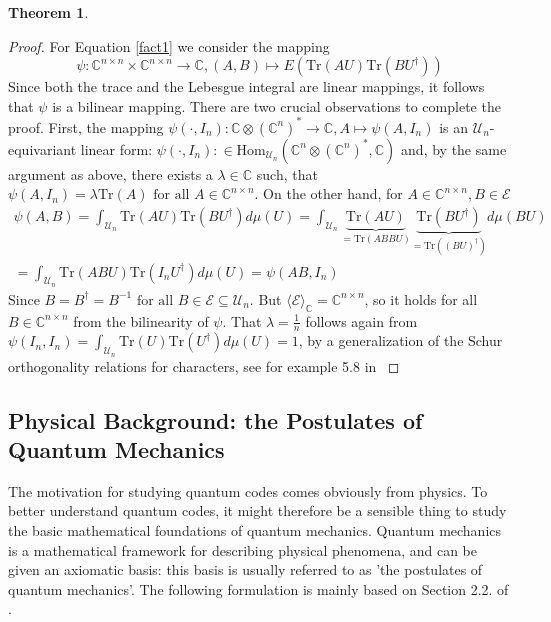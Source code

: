\documentclass[12pt,a4paper,BCOR15mm,twoside,DIV12]{article}
\def\E{\mathcal{E}}
\def\C{\mathbb{C}}
\def\U{\mathcal{U}}
\def\Hom{\text{Hom}}
\def\fa{\text{ for all }}
\def\Tr{\text{Tr}}
\theoremstyle{definition}
\newtheorem{theorem}[Satz]{Theorem}
\begin{document}
\begin{theorem}
\begin{proof}
For Equation \ref{fact1} we consider the mapping \[ \psi: \C^{n \times n} \times  \C^{n \times n} \rightarrow \C, (A,B) \mapsto  E(\Tr(AU)\Tr(B U^\dagger)) \]
Since both the trace and the Lebesgue integral are linear mappings, it follows that $\psi$ is a bilinear mapping. There are two crucial observations to complete the proof. First, the mapping $\psi( \cdot, I_n): \C \otimes (\C^n)^* \rightarrow \C, A \mapsto \psi(A,I_n)$ is an $\U_n$-equivariant linear form: $\psi( \cdot, I_n):  \in \Hom_{\U_n}(\C^n \otimes (\C^n)^*, \C)$ and, by the same argument as above, there exists a $\lambda \in \C$ such, that $\psi(A,I_n) = \lambda \Tr(A) \fa A \in \C^{n \times n}$.
On the other hand, for $A \in \C^{n \times n}, B \in \E$ 
\begin{align*} \psi(A,B) = \int_{\U_n} \Tr(AU) \Tr(BU^\dagger) d \mu(U) = \int_{\U_n} \underbrace{\Tr(AU)}_{= \Tr (ABBU)} \underbrace{\Tr(B U^\dagger)}_{= \Tr( (BU)^\dagger)} d \mu(BU) \\ = \int_{\U_n} \Tr(AB U) \Tr(I_n U^\dagger) d \mu(U) = \psi(AB,I_n) \end{align*}
Since $B = B^\dagger = B^{-1} \fa B \in \E \subseteq \U_n$. But $ \langle \E \rangle_\C = \C^{n \times n}$, so it holds for all $B \in \C^{n \times n}$ from the bilinearity of $\psi$. That $\lambda = \frac 1 n$ follows again from $\psi(I_n,I_n) = \int_{\U_n} \Tr(U) \Tr(U^{\dagger}) d \mu (U) = 1$, by a generalization of the Schur orthogonality relations for characters, see for example 5.8 in \cite{harmana}
\end{proof}
\end{theorem}

\subsection{Physical Background: the Postulates of Quantum Mechanics}

The motivation for studying quantum codes comes obviously from physics. To better understand quantum codes, it might therefore be a sensible thing to study the basic mathematical foundations of quantum mechanics. 
Quantum mechanics is a mathematical framework for describing physical phenomena, and can be given an axiomatic basis: this basis is usually referred to as 'the postulates of quantum mechanics'. The following formulation is mainly based on Section 2.2. of \cite{NC}. \\
\end{document}
